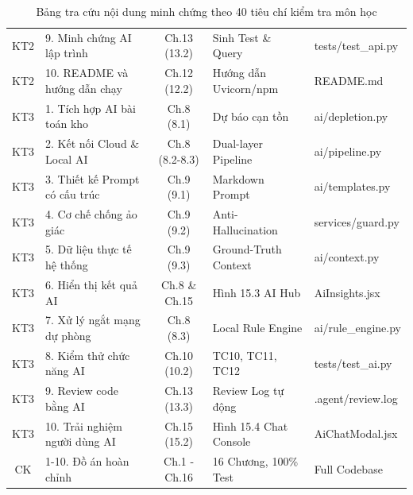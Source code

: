 \documentclass[12pt,a4paper,oneside]{report}
\begin{document}
\begin{table}[htbp]
\begin{tabularx}{\textwidth}{|c|X|c|X|X|}
KT2 & 9. Minh chứng AI lập trình & Ch.13 (13.2) & Sinh Test \& Query & tests/test\_api.py \\
KT2 & 10. README và hướng dẫn chạy & Ch.12 (12.2) & Hướng dẫn Uvicorn/npm & README.md \\
\hline
KT3 & 1. Tích hợp AI bài toán kho & Ch.8 (8.1) & Dự báo cạn tồn & ai/depletion.py \\
KT3 & 2. Kết nối Cloud \& Local AI & Ch.8 (8.2-8.3)& Dual-layer Pipeline & ai/pipeline.py \\
KT3 & 3. Thiết kế Prompt có cấu trúc & Ch.9 (9.1) & Markdown Prompt & ai/templates.py \\
KT3 & 4. Cơ chế chống ảo giác & Ch.9 (9.2) & Anti-Hallucination & services/guard.py \\
KT3 & 5. Dữ liệu thực tế hệ thống & Ch.9 (9.3) & Ground-Truth Context & ai/context.py \\
KT3 & 6. Hiển thị kết quả AI & Ch.8 \& Ch.15& Hình 15.3 AI Hub & AiInsights.jsx \\
KT3 & 7. Xử lý ngắt mạng dự phòng & Ch.8 (8.3) & Local Rule Engine & ai/rule\_engine.py \\
KT3 & 8. Kiểm thử chức năng AI & Ch.10 (10.2) & TC10, TC11, TC12 & tests/test\_ai.py \\
KT3 & 9. Review code bằng AI & Ch.13 (13.3) & Review Log tự động & .agent/review.log \\
KT3 & 10. Trải nghiệm người dùng AI & Ch.15 (15.2) & Hình 15.4 Chat Console & AiChatModal.jsx \\
\hline
CK & 1-10. Đồ án hoàn chỉnh & Ch.1 - Ch.16 & 16 Chương, 100\% Test & Full Codebase \\
\hline
\end{tabularx}
\caption{Bảng tra cứu nội dung minh chứng theo 40 tiêu chí kiểm tra môn học}
\label{tab:matrix}
\end{table}

\newpage
{}

















\end{document}
